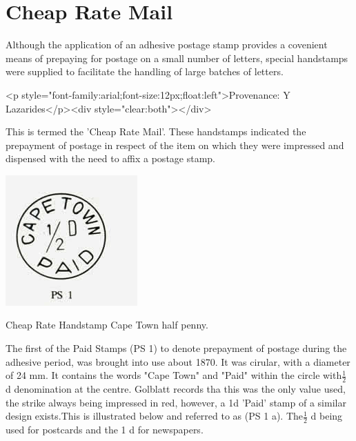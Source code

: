 \chapter{Cheap Rate Mail}

Although the application of an adhesive postage stamp provides a covenient
means of prepaying for postage on a small number of letters, 
special handstamps were supplied to facilitate the handling of large batches of letters.

<p style="font-family:arial;font-size:12px;float:left">Provenance: Y Lazarides</p><div style="clear:both"></div>


This is termed the 'Cheap Rate Mail'. These handstamps indicated the prepayment 
of postage in respect of the item on which they were impressed and dispensed 
with the need to affix a postage stamp.

\begin{marginfigure}
\centering
\includegraphics[width=.45\textwidth]{../cape-of-good-hope/cheap-rate-mail/cape-paid-1_2d.jpg}
\caption{Cheap Rate Handstamp Cape Town half penny.}
\end{marginfigure}


The first of the Paid Stamps (PS 1) to denote prepayment of postage during
 the adhesive period, was brought into use about 1870. 
 It was cirular, with a diameter of 24 mm. It contains the words "Cape Town" 
 and "Paid" within the circle with$\frac{1}{2}$ d denomination at the centre. 
 Golblatt records tha this was the only value used, the strike 
 always being impressed in red, however, a 1d 'Paid' stamp of a 
 similar design exists.This is illustrated below and referred to as (PS 1 a). 
 The$\frac{1}{2}$ d being used for postcards and the 1 d for newspapers.

